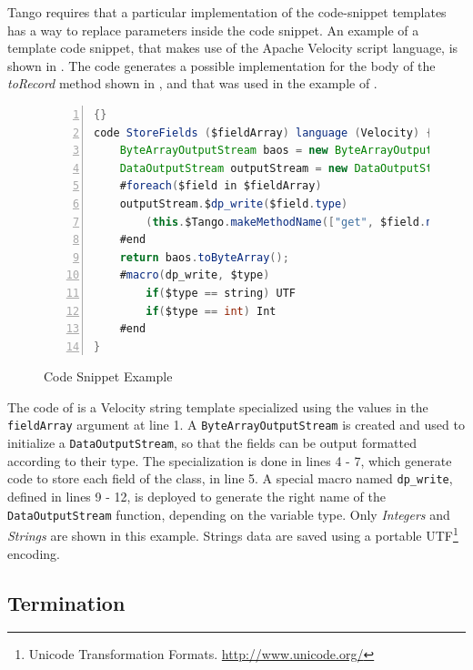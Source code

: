 Tango requires that a particular implementation of the code-snippet templates has a way to replace parameters inside the code snippet. An example of a template code snippet, that makes use of the Apache Velocity \cite{velocity} script language, is shown in . The code generates a possible implementation for the body of the \textit{toRecord} method shown in , and that was used in the example of .

\begin{figure}[ht]
	\centering
	\begin{minipage}[b]{8.5cm}
	\begin{center}	
\begin{scriptsize}
\begin{lstlisting}[numbers=left,language=Java,frame=leftline]{}
code StoreFields ($fieldArray) language (Velocity) {
    ByteArrayOutputStream baos = new ByteArrayOutputStream();
    DataOutputStream outputStream = new DataOutputStream(baos);
    #foreach($field in $fieldArray)
    outputStream.$dp_write($field.type)
        (this.$Tango.makeMethodName(["get", $field.name]()));
    #end
    return baos.toByteArray();
    #macro(dp_write, $type)
        if($type == string) UTF
        if($type == int) Int
    #end
}
		\end{lstlisting}
		\end{scriptsize}
	\end{center}
	\caption{Code Snippet Example}
	\label{fig:code}
\end{minipage}	
\end{figure}

The code of  is a Velocity string template specialized using the values in the \texttt{field\-Array} argument at line 1. A \texttt{Byte\-Array\-Output\-Stream} is created and used to initialize a \texttt{Data\-Output\-Stream}, so that the fields can be output formatted according to their type. The specialization is done in lines 4 - 7, which generate code to store each field of the class, in line 5. A special macro named \texttt{dp\_write}, defined in lines 9 - 12, is deployed to generate the right name of the \texttt{Data\-Output\-Stream} function, depending on the variable type. Only \textit{Inte\-gers} and \textit{Strings} are shown in this example. Strings data are saved using a portable UTF\footnote{Unicode Transformation Formats. \url{http://www.unicode.org/}} encoding.%

\subsection{Termination}
\label{sec.tango.terminate}

